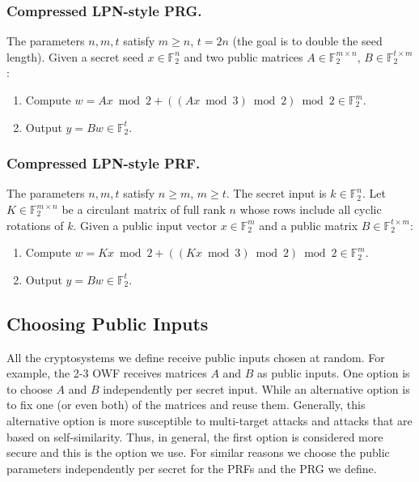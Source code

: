 \documentclass[orivec,envcountsect]{llncs}
\begin{document}
\subsubsection{Compressed LPN-style PRG.}

The parameters $n,m,t$ satisfy $m \geq n$, $t = 2n$ (the goal is to double the seed length).
Given a secret seed $x \in \mathbb{F}_2^n$ and
two public matrices $A \in \mathbb{F}_2^{m \times n}$,
$B \in \mathbb{F}_2^{t \times m}$:
\begin{enumerate}
  \item Compute $w = Ax \bmod 2 + ((Ax \bmod 3) \bmod 2) \bmod 2 \in \mathbb{F}_2^m$.
  \item Output $y = Bw \in \mathbb{F}_2^t$.
\end{enumerate}

\subsubsection{Compressed LPN-style PRF.}

The parameters $n,m,t$ satisfy $n \geq m$, $m \geq t$.
The secret input is $k \in \mathbb{F}_2^{n}$.
Let $K \in \mathbb{F}_2^{m \times n}$ be a circulant matrix of full rank $n$
whose rows include all cyclic rotations of $k$.
Given a public input vector $x \in \mathbb{F}^{m}_2$ and
a public matrix $B \in \mathbb{F}_2^{t \times m}$:
\begin{enumerate}
  \item Compute $w = Kx \bmod 2 + ((Kx \bmod 3) \bmod 2) \bmod 2 \in \mathbb{F}_2^m$.
  \item Output $y = Bw \in \mathbb{F}_2^t$.
\end{enumerate}

\subsection{Choosing Public Inputs}

All the cryptosystems we define receive public inputs chosen at random.
For example, the 2-3 OWF receives matrices $A$ and $B$ as public inputs.
One option is to choose $A$ and $B$ independently per secret input.
While an alternative option is to fix one (or even both) of the matrices and reuse them.
Generally, this alternative option is more susceptible to multi-target
attacks and attacks that are based on self-similarity.
Thus, in general, the first option is considered more secure and this is the option we use.
For similar reasons we choose the public parameters independently per secret for the
PRFs and the PRG we define.
\end{document}
